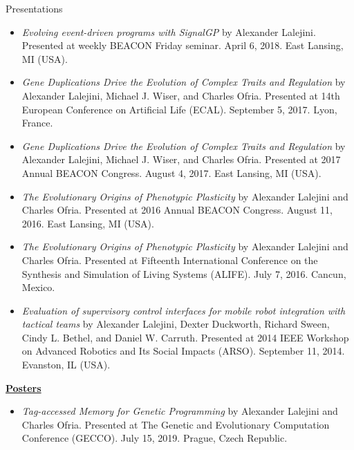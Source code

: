 \begin{rSection}{Presentations}
\begin{itemize}
\item \textit{Evolving event-driven programs with SignalGP}
by Alexander Lalejini.
Presented at weekly BEACON Friday seminar. April 6, 2018. East Lansing, MI (USA).

\item \textit{Gene Duplications Drive the Evolution of Complex Traits and Regulation}
by Alexander Lalejini, Michael J. Wiser, and Charles Ofria.
Presented at 14th European Conference on Artificial Life (ECAL). September 5, 2017. Lyon, France.

\item \textit{Gene Duplications Drive the Evolution of Complex Traits and Regulation}
by Alexander Lalejini, Michael J. Wiser, and Charles Ofria.
Presented at 2017 Annual BEACON Congress. August 4, 2017. East Lansing, MI (USA).

\item \textit{The Evolutionary Origins of Phenotypic Plasticity}
by Alexander Lalejini and Charles Ofria.
Presented at 2016 Annual BEACON Congress. August 11, 2016. East Lansing, MI (USA).

\item \textit{The Evolutionary Origins of Phenotypic Plasticity}
by Alexander Lalejini and Charles Ofria.
Presented at Fifteenth International Conference on the Synthesis and Simulation of Living Systems (ALIFE). July 7, 2016. Cancun, Mexico.

\item \textit{Evaluation of supervisory control interfaces for mobile robot integration with tactical teams}
by Alexander Lalejini, Dexter Duckworth, Richard Sween, Cindy L. Bethel, and Daniel W. Carruth.
Presented at 2014 IEEE Workshop on Advanced Robotics and Its Social Impacts (ARSO). September 11, 2014. Evanston, IL (USA).

\end{itemize}

\underline{\large {\bf Posters}}

\begin{itemize}

\item \textit{Tag-accessed Memory for Genetic Programming}
by Alexander Lalejini and Charles Ofria.
Presented at The Genetic and Evolutionary Computation Conference (GECCO). July 15, 2019. Prague, Czech Republic.


\end{itemize}
\end{rSection}
